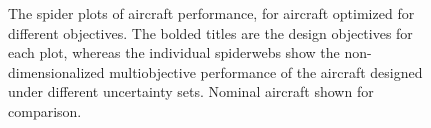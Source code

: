 \begin{figure}
\begin{center}
    \caption{The spider plots of aircraft performance, for aircraft optimized for different objectives.
    The bolded titles are the design objectives for each plot, whereas the individual spiderwebs
    show the non-dimensionalized multiobjective performance of the aircraft designed under different
    uncertainty sets. Nominal aircraft shown for comparison. }
    \label{fig:spider}
\end{center}
\end{figure}

